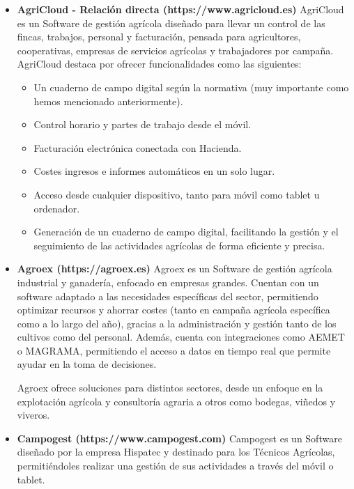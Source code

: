 \begin{itemize}
    \item \textbf{AgriCloud - Relación directa (https://www.agricloud.es)}
    \newline
    AgriCloud es un Software de gestión agrícola diseñado para llevar un control de las fincas, trabajos, personal y
    facturación, pensada para agricultores, cooperativas, empresas de servicios agrícolas y trabajadores por campaña.
    AgriCloud destaca por ofrecer funcionalidades como las siguientes:
    \begin{itemize}
        \item Un cuaderno de campo digital según la normativa (muy importante como hemos mencionado anteriormente).
        \item Control horario y partes de trabajo desde el móvil.
        \item Facturación electrónica conectada con Hacienda.
        \item Costes ingresos e informes automáticos en un solo lugar.
        \item Acceso desde cualquier dispositivo, tanto para móvil como tablet u ordenador.
        \item Generación de un cuaderno de campo digital, facilitando la gestión y el seguimiento de las actividades
        agrícolas de forma eficiente y precisa.
    \end{itemize} 
    
    \item \textbf{Agroex (https://agroex.es)}
    \newline
    Agroex es un Software de gestión agrícola industrial y ganadería, enfocado en empresas grandes. Cuentan con un software
    adaptado a las necesidades específicas del sector, permitiendo optimizar recursos y ahorrar costes (tanto en campaña
    agrícola específica como a lo largo del año), gracias a la administración y gestión tanto de los cultivos como del 
    personal. Además, cuenta con integraciones como AEMET o MAGRAMA, permitiendo el acceso a datos en tiempo real que 
    permite ayudar en la toma de decisiones.

    Agroex ofrece soluciones para distintos sectores, desde un enfoque en la explotación agrícola y consultoría agraria
    a otros como bodegas, viñedos y viveros.

    \item \textbf{Campogest (https://www.campogest.com)}
    \newline
    Campogest es un Software diseñado por la empresa Hispatec y destinado para los Técnicos Agrícolas, permitiéndoles 
    realizar una gestión de sus actividades a través del móvil o tablet.


\end{itemize}

